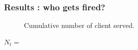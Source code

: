 \documentclass[10pt]{beamer}
\begin{document}
\begin{frame}
\frametitle{Results : who gets fired?}
\begin{figure}
\centering
{}

\caption{Cumulative number of client served.}
\end{figure}
\begin{center}
$N_t = $ 
\end{center}
\end{frame}
\end{document}
